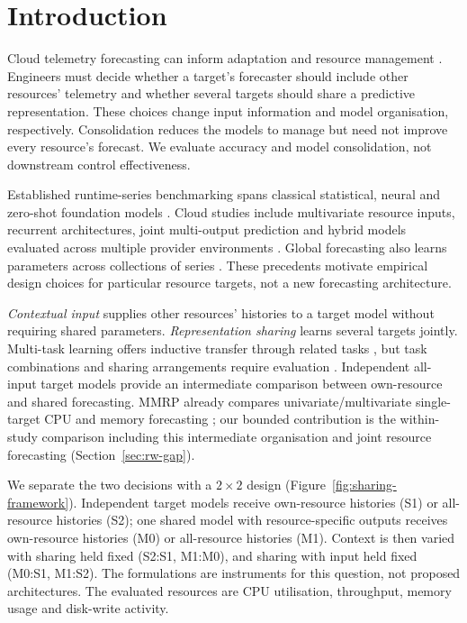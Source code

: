 \documentclass[5p,twocolumn]{elsarticle}
\begin{document}
\section{Introduction}
\label{sec:introduction}

Cloud telemetry forecasting can inform adaptation and resource management
\citep{Taherizadeh2018Monitoring,Bauer2020SelfAware}.
Engineers must decide whether a target's forecaster should include other
resources' telemetry and whether several targets should share a predictive
representation. These choices change input information and model organisation,
respectively. Consolidation reduces the models to manage but need not improve
every resource's forecast. We evaluate accuracy and model consolidation,
not downstream control effectiveness.

Established runtime-series benchmarking spans
classical statistical, neural and zero-shot foundation models
\citep{DiMenna2026RuntimeForecasting}. Cloud studies include multivariate
resource inputs, recurrent architectures, joint multi-output prediction and
hybrid models evaluated across multiple provider environments
\citep{Ullah2023CloudBiLSTM,Tripathi2025MMRP}. Global forecasting also learns
parameters across collections of series \citep{Salinas2020DeepAR}.
These precedents motivate empirical design choices for particular resource
targets, not a new forecasting architecture.

\emph{Contextual input} supplies other resources' histories to a target model
without requiring shared parameters. \emph{Representation sharing} learns
several targets jointly. Multi-task learning
offers inductive transfer through related tasks \citep{Caruana1997Multitask},
but task combinations and sharing arrangements require evaluation
\citep{Standley2020TaskGrouping,Fifty2021TaskGroupings,Nochumsohn2025MTLinear}.
Independent all-input target models provide an intermediate comparison
between own-resource and shared forecasting. MMRP already compares
univariate/multivariate single-target CPU and memory forecasting
\citep{Tripathi2025MMRP}; our bounded contribution is the within-study
comparison including this intermediate organisation and joint resource
forecasting (Section~\ref{sec:rw-gap}).

We separate the two decisions with a $2\times2$ design
(Figure~\ref{fig:sharing-framework}). Independent target models receive
own-resource histories (S1) or all-resource histories (S2); one shared model
with resource-specific outputs receives own-resource histories (M0) or
all-resource histories (M1). Context is then varied with sharing held fixed
(S2:S1, M1:M0), and sharing with input held fixed (M0:S1, M1:S2). The
formulations are instruments for this question, not proposed architectures.
The evaluated resources are CPU utilisation, throughput, memory usage and
disk-write activity.
\end{document}
